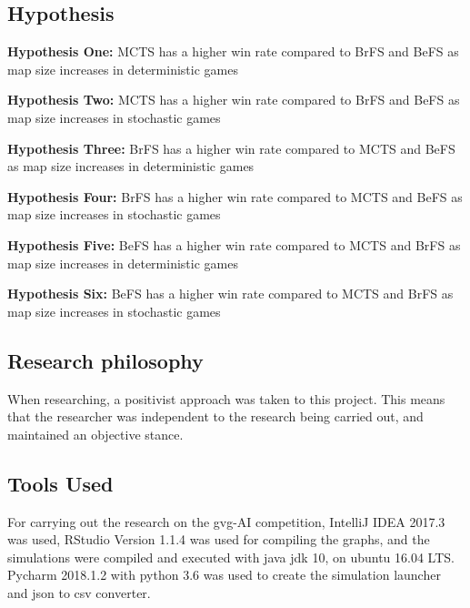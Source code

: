 \documentclass[journal]{IEEEtran}
\begin{document}
\subsection{Hypothesis}
	\textbf{Hypothesis One:}
		MCTS has a higher win rate compared to BrFS and BeFS as map size increases in deterministic games %

	\textbf{Hypothesis Two:}
		MCTS has a higher win rate compared to BrFS and BeFS as map size increases in stochastic games %

	\textbf{Hypothesis Three:}
		BrFS has a higher win rate compared to MCTS and BeFS as map size increases in deterministic games %

	\textbf{Hypothesis Four:}
		BrFS has a higher win rate compared to MCTS and BeFS as map size increases in stochastic games %
		
	\textbf{Hypothesis Five:}
		BeFS has a higher win rate compared to  MCTS and BrFS as map size increases in deterministic games %

	\textbf{Hypothesis Six:}
		BeFS has a higher win rate compared to  MCTS and BrFS as map size increases in stochastic games %


\subsection{Research philosophy}
	When researching, a positivist approach \cite{scientific-method, crossan2003research} was taken to this project. 
	This means that the researcher was independent to the research being carried out, and maintained an objective stance.
	
	





	\subsection{Tools Used}
	For carrying out the research on the gvg-AI competition, IntelliJ IDEA 2017.3 was used, RStudio Version 1.1.4 was used for compiling the graphs, and the simulations were compiled and executed with java jdk 10, on ubuntu 16.04 LTS.
	Pycharm 2018.1.2 with python 3.6 was used to create the simulation launcher and json to csv converter.
	
\end{document}
